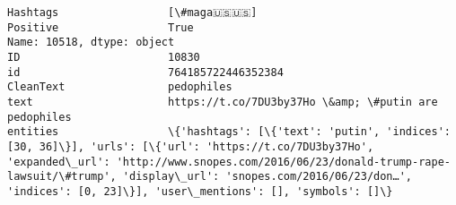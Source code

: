 \documentclass[11pt]{article}
\begin{document}
\begin{Verbatim}[commandchars=\\\{\}]
Hashtags                 [\#maga🇺🇸🇺🇸]                                                                                                                                                                                                                                                                                                                                                                                         
Positive                 True                                                                                                                                                                                                                                                                                                                                                                                                
Name: 10518, dtype: object
ID                       10830                                                                                                                                                                                                                                                                                                                                                                                             
id                       764185722446352384                                                                                                                                                                                                                                                                                                                                                                                
CleanText                pedophiles                                                                                                                                                                                                                                                                                                                                                                                        
text                     https://t.co/7DU3by37Ho \&amp; \#putin are pedophiles                                                                                                                                                                                                                                                                                                                                               
entities                 \{'hashtags': [\{'text': 'putin', 'indices': [30, 36]\}], 'urls': [\{'url': 'https://t.co/7DU3by37Ho', 'expanded\_url': 'http://www.snopes.com/2016/06/23/donald-trump-rape-lawsuit/\#trump', 'display\_url': 'snopes.com/2016/06/23/don…', 'indices': [0, 23]\}], 'user\_mentions': [], 'symbols': []\}                                                                                                    

\end{Verbatim}
\end{document}
